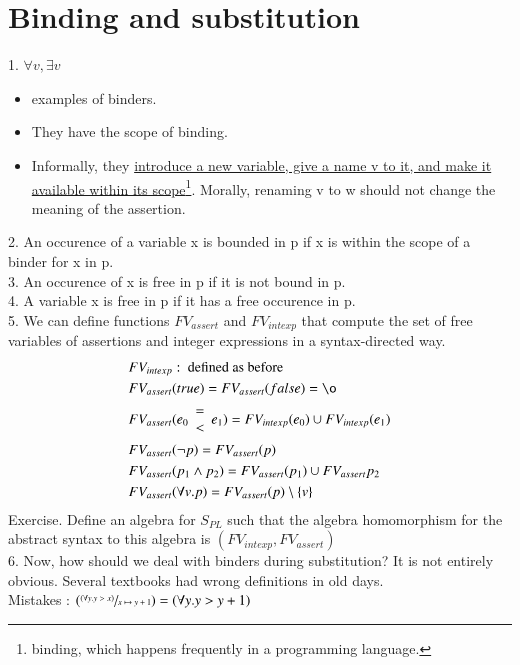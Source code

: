 \documentclass{report}[12pt]
\begin{document}
\section{Binding and substitution}
1. $\forall v, \exists v$
\begin{itemize}
    \item examples of binders.
    \item They have the scope of binding.
    \item Informally, they \underline{introduce a new variable, give a name v to it, and make it available within its scope}\footnote{binding, which happens frequently in a programming language.}. Morally, renaming v to w should not change the meaning of the assertion.
\end{itemize}
2. An occurence of a variable x is bounded in p if x is within the scope of a binder for x in p.\\
3. An occurence of x is free in p if it is not bound in p. \\
4. A variable x is free in p if it has a free occurence in p. \\
5. We can define functions $FV_{assert}$ and $FV_{intexp}$ that compute the set of free variables of assertions and integer expressions in a syntax-directed way.
\begin{align*}
    &FV_{intexp} : \text{ defined as before} \\
    &FV_{assert}(true) = FV_{assert}(false) = \o \\
    &FV_{assert}(e_0 \begin{array}{c}= \\ <\end{array} e_1) = FV_{intexp}(e_0) \cup FV_{intexp}(e_1) \\
    &FV_{assert}(\neg p) = FV_{assert}(p) \\
    &FV_{assert}(p_1 \wedge p_2) = FV_{assert}(p_1) \cup FV_{assert}{p_2} \\
    &FV_{assert}(\forall v. p) = FV_{assert}(p) \setminus \{v\}
\end{align*}
Exercise. Define an algebra for $S_{PL}$ such that the algebra homomorphism for the abstract syntax to this algebra is $(FV_{intexp}, FV_{assert})$ \\
6. Now, how should we deal with binders during substitution? It is not entirely obvious. Several textbooks had wrong definitions in old days. \\
Mistakes : $(\sfrac{(\forall y. y > x)}{x\mapsto y+1})=(\forall y.y>y+1)$ \\
\end{document}
